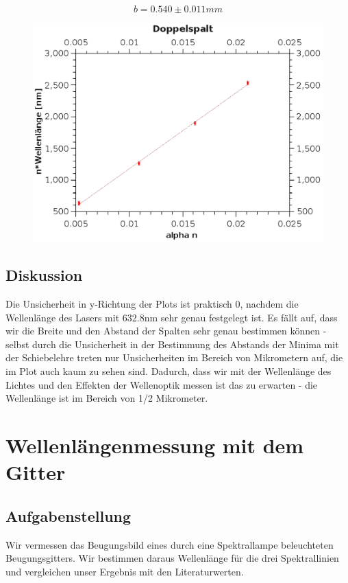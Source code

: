 \documentclass{article}
\begin{document}
$$\boxed{b=0.540 \pm 0.011 mm}$$
\begin{center}
\begin{figure}[H]
\includegraphics[scale=0.7]{doppelspalt.eps} 
\end{figure}
\end{center}
\subsection{Diskussion}
Die Unsicherheit in y-Richtung der Plots ist praktisch 0, nachdem die Wellenlänge des Lasers mit 632.8nm sehr genau festgelegt ist. Es fällt auf, dass wir die Breite und den Abstand der Spalten sehr genau bestimmen können - selbst durch die Unsicherheit in der Bestimmung des Abstands der Minima mit der Schiebelehre treten nur Unsicherheiten im Bereich von Mikrometern auf, die im Plot auch kaum zu sehen sind. Dadurch, dass wir mit der Wellenlänge des Lichtes und den Effekten der Wellenoptik messen ist das zu erwarten - die Wellenlänge ist im Bereich von 1/2 Mikrometer. 
\section{Wellenlängenmessung mit dem Gitter}

\subsection{Aufgabenstellung}
Wir vermessen das Beugungsbild eines durch eine Spektrallampe beleuchteten Beugungsgitters. Wir bestimmen daraus Wellenlänge für die drei Spektrallinien und vergleichen unser Ergebnis mit den Literaturwerten.
\end{document}

